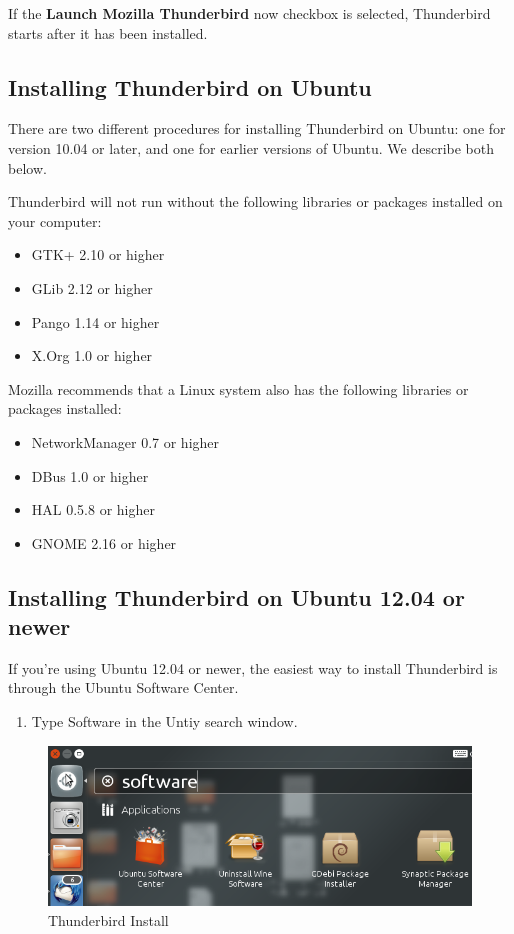 If the \textbf{Launch Mozilla Thunderbird} now checkbox is selected,
Thunderbird starts after it has been installed.

\subsection{Installing Thunderbird on Ubuntu}

There are two different procedures for installing Thunderbird on Ubuntu:
one for version 10.04 or later, and one for earlier versions of Ubuntu.
We describe both below.

Thunderbird will not run without the following libraries or packages
installed on your computer:

\begin{itemize}
\item
  GTK+ 2.10 or higher
\item
  GLib 2.12 or higher
\item
  Pango 1.14 or higher
\item
  X.Org 1.0 or higher
\end{itemize}
Mozilla recommends that a Linux system also has the following libraries
or packages installed:

\begin{itemize}
\item
  NetworkManager 0.7 or higher
\item
  DBus 1.0 or higher
\item
  HAL 0.5.8 or higher
\item
  GNOME 2.16 or higher
\end{itemize}
\subsection{Installing Thunderbird on Ubuntu 12.04 or newer}

If you're using Ubuntu 12.04 or newer, the easiest way to install
Thunderbird is through the Ubuntu Software Center.

\begin{enumerate}[1.]
\item
  Type Software in the Untiy search window.
\end{enumerate}
\begin{figure}[htbp]
\centering
\includegraphics{thunderbird_inst_ubuntu_1.jpg}
\caption{Thunderbird Install}
\end{figure}


